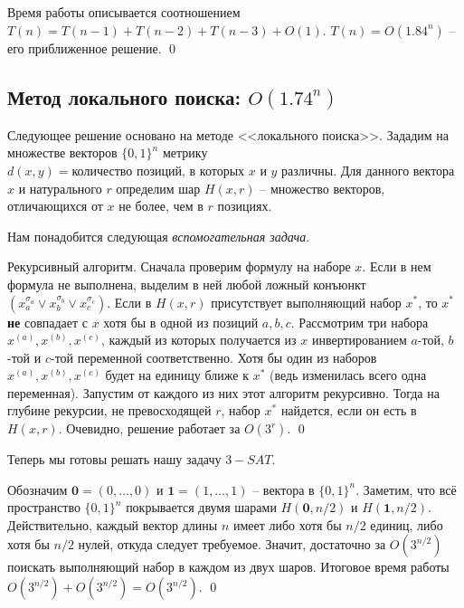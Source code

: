 Время работы описывается соотношением $T(n) = T(n-1) + T(n-2) + T(n-3) + O(1)$. $T(n) = O(1.84^n)$ -- его приближенное решение. \qed

\needpicture

\subsection{Метод локального поиска: $O(1.74^n)$}
Следующее решение основано на методе <<локального поиска>>. Зададим на множестве векторов $\{0, 1\}^n$ метрику $d(x, y) = \text{количество позиций, в которых } x \text{ и } y \text{ различны}$. Для данного вектора $x$ и натурального $r$ определим шар $H(x, r)$ -- множество векторов, отличающихся от $x$ не более, чем в $r$ позициях.

Нам понадобится следующая \hypertarget{flip20}{\textit{вспомогательная задача}}.


 Рекурсивный алгоритм. Сначала проверим формулу на наборе $x$. Если в нем формула не выполнена, выделим в ней любой ложный конъюнкт $(x_a^{\sigma_a} \lor x_b^{\sigma_b} \lor x_c^{\sigma_c})$. Если в $H(x, r)$ присутствует выполняющий набор $x^*$, то $x^*$ \textbf{не} совпадает с $x$ хотя бы в одной из позиций $a,b,c$. Рассмотрим три набора $x^{(a)}, x^{(b)}, x^{(c)}$, каждый из которых получается из $x$ инвертированием $a$-той, $b$-той и $c$-той переменной соответственно. Хотя бы один из наборов  $x^{(a)}, x^{(b)}, x^{(c)}$ будет на единицу ближе к $x^*$ (ведь изменилась всего одна переменная). Запустим от каждого из них этот алгоритм рекурсивно. Тогда на глубине рекурсии, не превосходящей $r$, набор $x^*$ найдется, если он есть в $H(x, r)$. Очевидно, решение работает за $O(3^r)$. \qed

Теперь мы готовы решать нашу задачу $3-SAT$.


Обозначим $\mathbf 0 = (0, \ldots, 0)$ и $\mathbf 1 = (1, \ldots, 1)$ -- вектора в $\{0, 1\}^n$. Заметим, что всё пространство $\{0, 1\}^n$ покрывается двумя шарами $H(\mathbf 0, n/2)$ и $H(\mathbf 1, n/2)$. Действительно, каждый вектор длины $n$ имеет либо хотя бы $n/2$ единиц, либо хотя бы $n/2$ нулей, откуда следует требуемое. Значит, достаточно за $O(3^{n/2})$ поискать выполняющий набор в каждом из двух шаров. Итоговое время работы $O(3^{n/2}) + O(3^{n/2}) = O(3^{n/2})$. \qed




